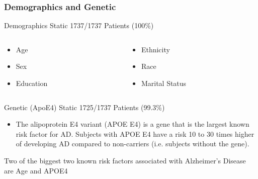 \documentclass{beamer}
\begin{document}
    \begin{frame}
        \frametitle{Demographics and Genetic}
        Demographics Static \hfill 1737/1737 Patients (100\%)\\
        \vspace{0.2in}

        \begin{columns}
        \begin{column}{0.5\textwidth}
            \begin{itemize}
                \item Age
                \item Sex
                \item Education
            \end{itemize}
        \end{column}
        \begin{column}{0.5\textwidth}
            \begin{itemize}
                \item Ethnicity
                \item Race
                \item Marital Status
            \end{itemize}
        \end{column}
        \end{columns}
        \vspace{0.2in}
        Genetic (ApoE4)
        Static \hfill 1725/1737 Patients (99.3\%)
        \begin{itemize}
            \item The alipoprotein E4 variant (APOE E4) is a gene that is the largest known risk factor for AD. Subjects with APOE E4 have a risk 10 to 30 times higher of developing AD compared to non-carriers (i.e. subjects without the gene).
        \end{itemize}
        \vspace{0.2in}
        Two of the biggest two known risk factors associated with Alzheimer's Disease are Age and APOE4

    \end{frame}
\end{document}
